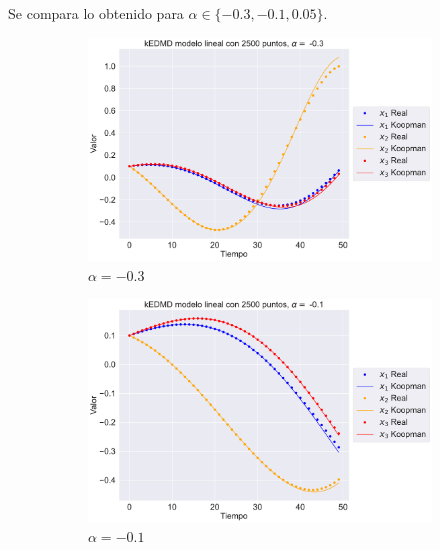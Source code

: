 Se compara lo obtenido para $\alpha \in \{ -0.3, -0.1, 0.05\}$.
\begin{figure}[htbp]
    \centering
    \begin{subfigure}[b]{0.32\textwidth}
        \centering
        \includegraphics[width=\textwidth]{img/content/chapter3/Linear1.pdf}
        \caption{$\alpha=-0.3$}
        \label{fig:image1}
    \end{subfigure}
    \hfill
    \begin{subfigure}[b]{0.32\textwidth}
        \centering
        \includegraphics[width=\textwidth]{img/content/chapter3/Linear2.pdf}
        \caption{$\alpha=-0.1$}
        \label{fig:image2}
    \end{subfigure}
    \hfill
    \begin{subfigure}[b]{0.32\textwidth}
        \centering

\end{subfigure}
\end{figure}
